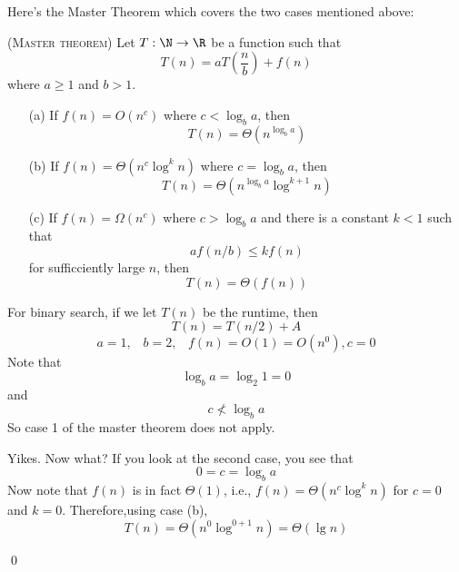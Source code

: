 \begin{comment}
Altogether we have the following.
If $n = b^k$, then
\[
T(n) = a^k T \left( b^0 \right)
 + a^{k-1} f(b^1) + \cdots + a f(b^{k-1}) + f(b^k)
\]
where
\[
a^k T \left( b^0 \right) = \Theta \left( n^{\log_b a} \right)
\]
and if $f(n) = \Theta(n^c)$ where $c = \log_b a$, then
\[
a^{k-1} f(b^1) + \cdots + a f(b^{k-1}) + f(b^k) =
\Theta \left( \log n \cdot  n^{\log_b a}\right)
\]
I conclude that 
\[
T(n)
=
\Theta \left( n^{\log_b a} \log n \right)
\]

Before we celebrate, remember that I made the assumption
\[
f(n) = \Theta(n^c), \,\,\,\,\, c = \log_b a
\]
What if
\[
f(n) = \Theta(n^c), \,\,\,\,\, c \neq \log_b a
\]
We're missing the case $c < \log_b a$ and $c > \log_b a$.
Also, what if $f(n) = O(n^c)$?
Or what if $f(n) = O(\log n)$?
Etc.

Here's the famous \defterm{master theorem} ...

\end{comment}


\newpage
Here's the Master Theorem which covers the two cases mentioned above:

\begin{thm} \textsc{(Master theorem)}
Let $T : \N \rightarrow \R$ be a function such that
\[
T(n)
= a T \left( \frac{n}{b} \right) + f(n)
\]
where $a \geq 1$ and $b > 1$.
\begin{enumerate}
  \item[(a)] If $f(n) = O(n^c)$ where $c <  \log_b a$, then
  \[
  T(n) = \Theta \left( n^{\log_b a} \right)
  \]
  
  \item[(b)] If $f(n) = \Theta(n^c \log^k n)$ where $c = \log_b a$, then
  \[
  T(n) = \Theta \left( n^{\log_b a} \log^{k+1} n \right)
  \]

  \item[(c)] If $f(n) = \Omega(n^c)$ where $c > \log_b a$ and
  there is a constant $k < 1$ such that  
  \[
  a f(n/b) \leq k f(n)
  \]
  for sufficciently large $n$, then
  \[
  T(n) = \Theta(f(n))
  \]
\end{enumerate}
\end{thm}

\newpage
\begin{eg}
  For binary search, if we let $T(n)$ be the runtime, then
  \[
  T(n) = T(n/2) + A
  \]
  \[
  a = 1, \,\,\,\,\, b = 2, \,\,\,\,\, f(n) = O(1) = O(n^0), c = 0
  \]
  Note that
  \[
  \log_b a = \log_2 1 = 0
  \]
  and
  \[
  c \not< \log_b a
  \]
  So case 1 of the master theorem does not apply.

  Yikes. Now what?
  If you look at the second case, you see that
  \[
  0 = c = \log_b a
  \]
  Now note that $f(n)$ is in fact $\Theta(1)$, i.e., $f(n) = \Theta(n^c \log^k n)$
  for $c = 0$ and $k = 0$.
  Therefore,using case (b),
  \[
  T(n) = \Theta(n^0 \log^{0+1} n) = \Theta(\lg n)
  \]
\end{eg}
\qed


